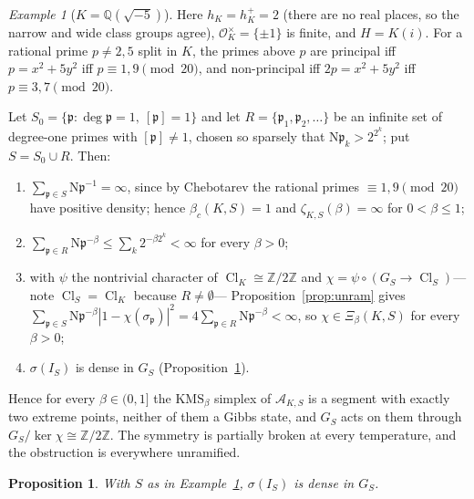 \documentclass[11pt]{amsart}
\numberwithin{equation}{section}
\newtheorem{proposition}[theorem]{Proposition}
\theoremstyle{definition}
\theoremstyle{remark}
\newtheorem{example}[theorem]{Example}
\newcommand{\Z}{\mathbb{Z}}
\newcommand{\Q}{\mathbb{Q}}
\newcommand{\Cl}{\operatorname{Cl}}
\newcommand{\Ns}{\mathrm{N}}
\newcommand{\cA}{\mathcal{A}}
\newcommand{\cO}{\mathcal{O}}
\newcommand{\pp}{\mathfrak{p}}
\begin{document}
\begin{example}[$K=\Q(\sqrt{-5})$]\label{ex:sqrt5}
Here $h_K=h^+_K=2$ (there are no real places, so the narrow and wide class
groups agree), $\cO_K^\times=\{\pm1\}$ is finite, and $H=K(i)$. For a rational
prime $p\neq2,5$ split in $K$, the primes above $p$ are principal iff
$p=x^2+5y^2$ iff $p\equiv1,9\pmod{20}$, and non-principal iff $2p=x^2+5y^2$
iff $p\equiv3,7\pmod{20}$.

Let $S_0=\{\pp:\deg\pp=1,\ [\pp]=1\}$ and let $R=\{\pp_1,\pp_2,\dots\}$ be an
infinite set of degree-one primes with $[\pp]\neq1$, chosen so sparsely that
$\Ns\pp_k>2^{2^k}$; put $S=S_0\cup R$. Then:
\begin{enumerate}
\item $\sum_{\pp\in S}\Ns\pp^{-1}=\infty$, since by Chebotarev the rational
primes $\equiv1,9\pmod{20}$ have positive density; hence $\beta_c(K,S)=1$ and
$\zeta_{K,S}(\beta)=\infty$ for $0<\beta\le1$;
\item $\sum_{\pp\in R}\Ns\pp^{-\beta}\le\sum_k2^{-\beta2^k}<\infty$ for every
$\beta>0$;
\item with $\psi$ the nontrivial character of $\Cl_K\cong\Z/2\Z$ and
$\chi=\psi\circ(G_S\to\Cl_S)$---note $\Cl_S=\Cl_K$ because $R\neq\emptyset$---
Proposition~\ref{prop:unram} gives
$\sum_{\pp\in S}\Ns\pp^{-\beta}|1-\chi(\sigma_\pp)|^2=4\sum_{\pp\in R}\Ns\pp^{-\beta}<\infty$,
so $\chi\in\Xi_\beta(K,S)$ for every $\beta>0$;
\item $\sigma(I_S)$ is dense in $G_S$ (Proposition~\ref{prop:densesqrt5}).
\end{enumerate}
Hence for every $\beta\in(0,1]$ the $\mathrm{KMS}_\beta$ simplex of $\cA_{K,S}$
is a segment with exactly two extreme points, neither of them a Gibbs state,
and $G_S$ acts on them through $G_S/\ker\chi\cong\Z/2\Z$. The symmetry is
partially broken at every temperature, and the obstruction is everywhere
unramified.
\end{example}

\begin{proposition}\label{prop:densesqrt5}
With $S$ as in Example~\ref{ex:sqrt5}, $\sigma(I_S)$ is dense in $G_S$.
\end{proposition}
\end{document}
